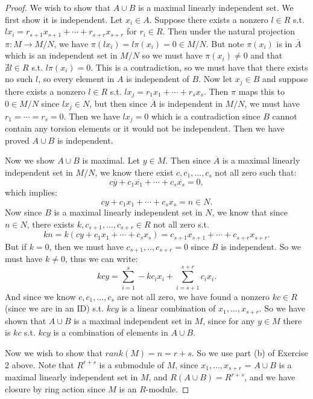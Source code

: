 \documentclass[12pt]{amsbook}
\theoremstyle{plain}
\numberwithin{section}{chapter}
\numberwithin{equation}{chapter}
\theoremstyle{definition}
\theoremstyle{remark}
\renewcommand{\bar}{\overline}%
\begin{document}
\begin{enumerate}[label=\arabic*.]
\begin{proof}
We wish to show that $A \cup B$ is a maximal linearly independent set. We first show it is independent. Let $x_i \in A$. Suppose there exists a nonzero $l \in R$ s.t. $lx_i = r_{s + 1}x_{s + 1} + \cdots + r_{s + r}x_{s + r}$ for $r_i \in R$. Then under the natural projection $\pi:M \to M/N$, we have $\pi(lx_i) = l\pi(x_i) = 0 \in M/N$. But note $\pi(x_i)$ is in $\bar{A	}$ which is an independent set in $M/N$ so we must have $\pi(x_i) \neq 0$ and that $\nexists l \in R$ s.t. $l\pi(x_i) = 0$. This is a contradiction, so we must have that there exists no such $l$, so every element in $A$ is independent of $B$. Now let $x_j \in B$ and suppose there exists a nonzero $l \in R$ s.t. $lx_j = r_1x_1 + \cdots + r_sx_s$. Then $\pi$ maps this to $0 \in M/N$ since $lx_j \in N$, but then since $\bar{A}$ is independent in $M/N$, we must have $r_1 = \cdots = r_s = 0$. Then we have $lx_j = 0$ which is a contradiction since $B$ cannot contain any torsion elements or it would not be independent. Then we have proved $A\cup B$ is independent. 



Now we show $A \cup B$ is maximal. Let $y \in M$. Then since $\bar{A}$ is a maximal linearly independent set in $M/N$, we know there exist $c,c_1,...,c_s$ not all zero such that:
$$
c\bar{y} + c_1\bar{x_1} + \cdots + c_s\bar{x_s} = 0,
$$
 which implies:
 $$
 cy + c_1x_1 + \cdots + c_sx_s = n \in N.
 $$
Now since $B$ is a maximal linearly independent set in $N$, we know that since $n \in N$, there exists $k,c_{s + 1},...,c_{s + r} \in R$ not all zero s.t. 
$$
kn = k(cy + c_1x_1 + \cdots + c_sx_s) = c_{s + 1}x_{s + 1} + \cdots + c_{s + r}x_{s + r}.
$$
But if $k = 0$, then we must have $c_{s + 1},..,c_{s + r} = 0$ since $B$ is independent. So we must have $k \neq 0$, thus we can write:
$$
kcy = \sum_{i = 1}^s-kc_ix_i + \sum_{i = s + 1}^{s + r}c_ix_i.
$$
And since we know $c,c_1,...,c_s$ are not all zero, we have found a nonzero $kc \in R$ (since we are in an ID) s.t. $kcy$ is a linear combination of $x_1,...,x_{s + r}$. So we have shown that $A \cup B$ is a maximal independent set in $M$, since for any $y \in M$ there is $kc$ s.t. $kcy$ is a combination of elements in $A \cup B$. 

Now we wish to show that $rank(M) = n = r + s$. So we use part (b) of Exercise 2 above. Note that $R^{r + s}$ is a submodule of $M$, since $x_1,...,x_{s + r}$ = $A \cup B$ is a maximal linearly independent set in $M$, and $R(A \cup B) = R^{r + s}$, and we have closure by ring action since $M$ is an $R$-module. 


\end{proof}
\end{enumerate}
\end{document}
